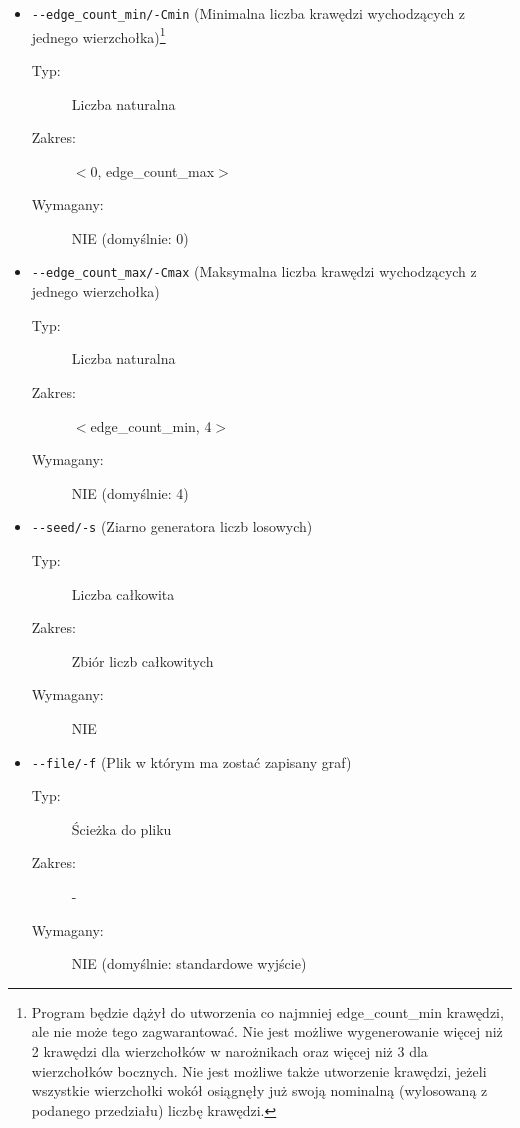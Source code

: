 \documentclass[11pt,a4paper]{report}
\begin{document}
\begin{itemize}
\begin{description}
            \item[Zakres:] $<$edge\_weight\_min, 1$>$
            \item[Wymagany:] NIE (domyślnie: 1)
        \end{description}
        \item \verb|--edge_count_min/-Cmin| (Minimalna liczba krawędzi wychodzących z jednego wierzchołka)\footnote{Program będzie dążył do utworzenia co najmniej edge\_count\_min krawędzi, ale nie może tego zagwarantować. Nie jest możliwe wygenerowanie więcej niż 2 krawędzi dla wierzchołków w narożnikach oraz więcej niż 3 dla wierzchołków bocznych. Nie jest możliwe także utworzenie krawędzi, jeżeli wszystkie wierzchołki wokół osiągnęły już swoją nominalną (wylosowaną z podanego przedziału) liczbę krawędzi.}
        \begin{description}
            \item[Typ:] Liczba naturalna
            \item[Zakres:] $<$0, edge\_count\_max$>$
            \item[Wymagany:] NIE (domyślnie: 0)
        \end{description}
        \item \verb|--edge_count_max/-Cmax| (Maksymalna liczba krawędzi wychodzących z jednego wierzchołka)
        \begin{description}
            \item[Typ:] Liczba naturalna
            \item[Zakres:] $<$edge\_count\_min, 4$>$
            \item[Wymagany:] NIE (domyślnie: 4)
        \end{description}
        \item \verb|--seed/-s| (Ziarno generatora liczb losowych)
        \begin{description}
            \item[Typ:] Liczba całkowita
            \item[Zakres:] Zbiór liczb całkowitych
            \item[Wymagany:] NIE
        \end{description}
        \item \verb|--file/-f| (Plik w którym ma zostać zapisany graf)
        \begin{description}
            \item[Typ:] Ścieżka do pliku
            \item[Zakres:] -
            \item[Wymagany:] NIE (domyślnie: standardowe wyjście)
        \end{description}
    \end{itemize}
\end{document}
